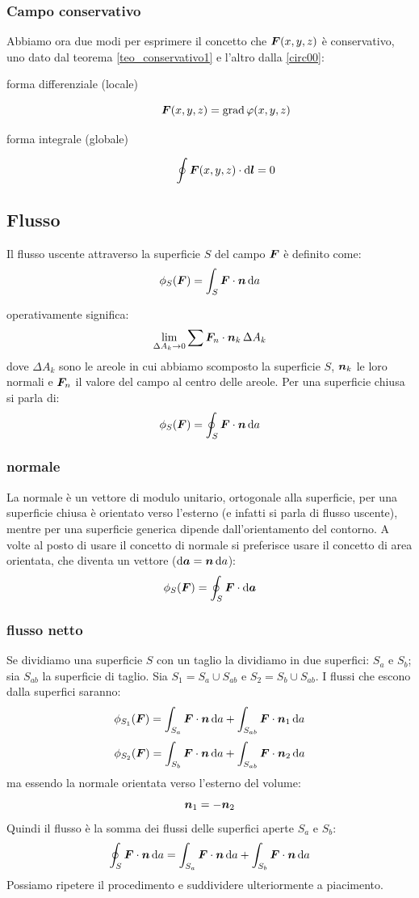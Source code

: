 \subsubsection{Campo conservativo}
Abbiamo ora due modi per esprimere il concetto che $\boldsymbol{F}(x,y,z)$ è conservativo, uno dato dal teorema \ref{teo_conservativo1} e l'altro dalla \eqref{circ00}:
\begin{description}
  \item[forma differenziale (locale)]\[\boldsymbol{F}(x,y,z)=\operatorname{grad}\varphi(x,y,z)\]
  \item[forma integrale (globale)]\[\oint\boldsymbol{F}(x,y,z)\cdot\mathrm{d}\boldsymbol{l}=0\]
\end{description}
\subsection{Flusso}
\begin{Def}
  Il flusso uscente attraverso la superficie $S$ del campo $\boldsymbol{F}$ è definito come:
  \[\phi_S(\boldsymbol{F})=\int_S \boldsymbol{F}\cdot \boldsymbol{n}\, \mathrm{d} a\]
\end{Def}
operativamente significa:
\[\lim_{\Delta A_k\to 0}\sum \boldsymbol{F}_n\cdot \boldsymbol{n}_k\,\Delta A_k\]
dove $\Delta A_k$ sono le areole in cui abbiamo scomposto la superficie $S$, $\boldsymbol{n}_k$ le loro normali e $\boldsymbol{F}_n$ il valore del campo al centro delle areole. Per una superficie chiusa si parla di:
\[\phi_S(\boldsymbol{F})=\oint_S \boldsymbol{F}\cdot \boldsymbol{n}\, \mathrm{d} a\]
\subsubsection{normale}
La normale è un vettore di modulo unitario, ortogonale alla superficie, per una superficie chiusa è orientato verso l'esterno (e infatti si parla di flusso uscente), mentre per una superficie generica dipende dall'orientamento del contorno. A volte al posto di usare il concetto di normale si preferisce usare il concetto di area orientata, che diventa un vettore ($\mathrm{d} \boldsymbol{a}=\boldsymbol{n}\,\mathrm{d} a$):
\[\phi_S(\boldsymbol{F})=\oint_S \boldsymbol{F}\cdot \mathrm{d} \boldsymbol{a}\]
\subsubsection{flusso netto}
Se dividiamo una superficie $S$ con un taglio la dividiamo in due superfici: $S_a$ e $S_b$; sia $S_{ab}$ la superficie di taglio. Sia $S_1=S_a\cup S_{ab}$ e $S_2=S_b\cup S_{ab}$. I flussi che escono dalla superfici saranno:
\[\phi_{S_1}(\boldsymbol{F})=\int_{S_a}\boldsymbol{F}\cdot\boldsymbol{n}\,\mathrm{d} a+\int_{S_{ab}}\boldsymbol{F}\cdot\boldsymbol{n}_1\,\mathrm{d} a\]
\[\phi_{S_2}(\boldsymbol{F})=\int_{S_b}\boldsymbol{F}\cdot\boldsymbol{n}\,\mathrm{d} a+\int_{S_{ab}}\boldsymbol{F}\cdot\boldsymbol{n}_2\,\mathrm{d} a\]
ma essendo la normale orientata verso l'esterno del volume:
\[\boldsymbol{n}_1=-\boldsymbol{n}_2\]
Quindi il flusso è la somma dei flussi delle superfici aperte $S_a$ e $S_b$:
\[\oint_S\boldsymbol{F}\cdot\boldsymbol{n}\,\mathrm{d} a=\int_{S_a}\boldsymbol{F}\cdot\boldsymbol{n}\,\mathrm{d} a+\int_{S_b}\boldsymbol{F}\cdot \boldsymbol{n}\,\mathrm{d} a\]
Possiamo ripetere il procedimento e suddividere ulteriormente a piacimento.

